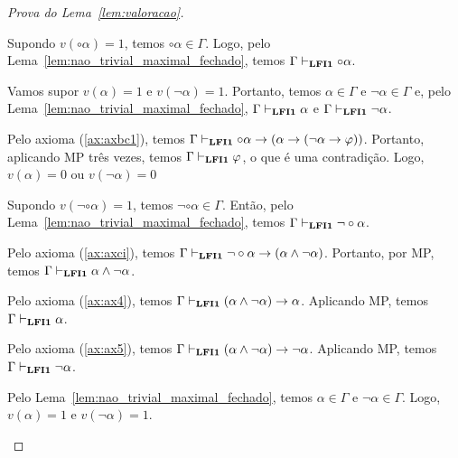 \begin{proof}[Prova do Lema~\ref{lem:valoracao}]
\begin{provaporcasos}

                        \begin{adjustwidth}{1cm}{}
                            \noindent Supondo $v(\circ \alpha) = 1$, temos $\circ \alpha \in \Gamma$. Logo, pelo Lema~\ref{lem:nao_trivial_maximal_fechado}, temos $\Gamma \vdash_{{\normalfont\textbf{LFI1}}{}} \circ \alpha$.

                            \noindent Vamos supor $v(\alpha) = 1$ e $v(\neg \alpha) = 1$. Portanto, temos $\alpha \in \Gamma$ e $\neg \alpha \in \Gamma$ e, pelo Lema~\ref{lem:nao_trivial_maximal_fechado}, $\Gamma \vdash_{{\normalfont\textbf{LFI1}}{}} \alpha$ e $\Gamma \vdash_{{\normalfont\textbf{LFI1}}{}} \neg \alpha$.

                            \noindent Pelo axioma (\ref{ax:axbc1}), temos $\Gamma \vdash_{{\normalfont\textbf{LFI1}}{}} \circ \alpha \to (\alpha \to (\neg \alpha \to \varphi))$. Portanto, aplicando MP três vezes, temos $\Gamma \vdash_{{\normalfont\textbf{LFI1}}{}} \varphi$, o que é uma contradição. Logo, $v(\alpha) = 0$ ou $v(\neg \alpha) = 0$
                        


                        \end{adjustwidth}
                    

                        \begin{adjustwidth}{1cm}{}
                            
                            \noindent Supondo $v(\neg \circ \alpha) = 1$, temos $\neg \circ \alpha \in \Gamma$. Então, pelo Lema~\ref{lem:nao_trivial_maximal_fechado}, temos $\Gamma \vdash_{{\normalfont\textbf{LFI1}}{}} \neg \circ \alpha$.

                            Pelo axioma (\ref{ax:axci}), temos $\Gamma \vdash_{{\normalfont\textbf{LFI1}}{}} \neg \circ \alpha \to (\alpha \land \neg \alpha)$. Portanto, por MP, temos $\Gamma \vdash_{{\normalfont\textbf{LFI1}}{}} \alpha \land \neg \alpha$. 
                            
                            Pelo axioma (\ref{ax:ax4}), temos $\Gamma \vdash_{{\normalfont\textbf{LFI1}}{}} (\alpha \land \neg \alpha) \to \alpha$. Aplicando MP, temos $\Gamma \vdash_{{\normalfont\textbf{LFI1}}{}} \alpha$.
                            
                            Pelo axioma (\ref{ax:ax5}), temos $\Gamma \vdash_{{\normalfont\textbf{LFI1}}{}} (\alpha \land \neg \alpha) \to \neg \alpha$. Aplicando MP, temos $\Gamma \vdash_{{\normalfont\textbf{LFI1}}{}} \neg \alpha$.

                            Pelo Lema~\ref{lem:nao_trivial_maximal_fechado}, temos $\alpha \in \Gamma$ e $\neg \alpha \in \Gamma$. Logo, $v(\alpha) = 1$ e $v(\neg \alpha) = 1$.


\end{adjustwidth}
\end{provaporcasos}
\end{proof}
